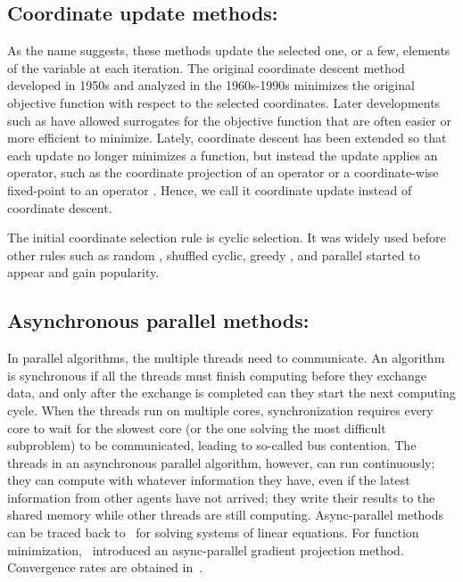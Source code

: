 \subsection*{Coordinate update methods:}
As the name suggests, these methods update the selected one, or a few, elements of the variable at each iteration. The original  coordinate descent method \citep{Hildreth1957_quadratic,Warga1963_minimizing,SargentSebastian1973_convergence,LuoTseng1992_convergence} developed in 1950s and analyzed in the 1960s-1990s minimizes the original objective function with respect to the selected coordinates. Later developments such as \citep{GrippoSciandrone2000_convergence,TsengYun2009_coordinate,TsengYun2009_blockcoordinate,XuYin2013_block,BolteSabachTeboulle2014_proximal} have allowed surrogates for the objective function that are often easier or more efficient to minimize. Lately, coordinate descent has been extended so that each update no longer minimizes a function, but instead the update applies an operator, such as the coordinate projection of an operator or a coordinate-wise fixed-point to an operator \citep{CombettesPesquet2015_stochastic,BianchiHachemFranck2014_stochastic,PengXuYanYin2015_arock,PengWuXuYanYin2016_coordinate}. Hence, we call it coordinate update instead of coordinate descent.

The initial coordinate selection rule  is cyclic selection. It was widely used before other rules such as random \citep{Nesterov2012_efficiency,RichtarikTakac2014_iteration,LuXiao2015_complexity}, shuffled cyclic, greedy \citep{BertsekasBertsekas1999_nonlinear,LiOsher2009_coordinate,TsengYun2009_coordinate,PengYanYin2013_parallel,NutiniSchmidtLaradjiFriedlanderKoepke2015_coordinate}, and parallel \citep{BradleyKyrolaBicksonGuestrin2011_parallel,richtarik2016parallel} started to appear and gain popularity.


\subsection*{Asynchronous parallel methods:}

In  parallel algorithms, the multiple threads need to communicate. An algorithm is synchronous if all the  threads must finish computing before they exchange data, and only after the exchange is completed can they start the next computing cycle. When the threads run on multiple cores, synchronization requires every core to wait for the slowest core
(or the one solving the most difficult subproblem) to be communicated,  leading to so-called bus contention. The threads in an asynchronous parallel algorithm, however, can run continuously; they can compute with whatever information they have, even if the latest information from other agents
have not arrived; they write their results to the shared memory while other threads are still computing. Async-parallel methods can be traced back to~\citep{chazan1969chaotic} for solving systems of linear equations.
For function minimization,~\citep{bertsekas1989parallel} introduced an async-parallel gradient projection method. Convergence rates are obtained in~\citep{tseng1991rate-asyn}.

